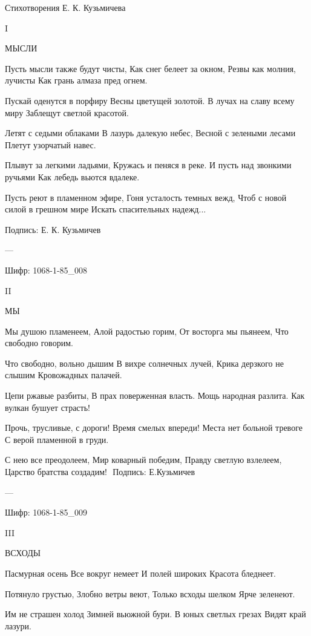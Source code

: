 Стихотворения Е. К. Кузьмичева

I

МЫСЛИ

Пусть мысли также будут чисты,
          Как снег белеет за окном, 
Резвы как молния, лучисты
          Как грань алмаза пред огнем.

Пускай оденутся в порфиру
          Весны цветущей золотой.
В лучах на славу всему миру
          Заблещут светлой красотой.

Летят с седыми облаками
          В лазурь далекую небес,
Весной с зелеными лесами
          Плетут узорчатый навес.

Плывут за легкими ладьями,
          Кружась и пеняся в реке.
И пусть над звонкими ручьями
          Как лебедь вьются вдалеке.

Пусть реют в пламенном эфире,
          Гоня усталость темных вежд,
Чтоб с новой силой в грешном мире
          Искать спасительных надежд...

Подпись: Е. К. Кузьмичев
          
---

Шифр: 1068-1-85_008

II

МЫ


Мы душою пламенеем,
Алой радостью горим,
От восторга мы пьянеем,
Что свободно говорим.

    Что свободно, вольно дышим
    В вихре солнечных лучей,
    Крика дерзкого не слышим
    Кровожадных палачей.

Цепи ржавые разбиты,
В прах поверженная власть.
Мощь народная разлита.
Как вулкан бушует страсть!

    Прочь, трусливые, с дороги!
    Время смелых впереди!
    Места нет больной тревоге
    С верой пламенной в груди.

С нею все преодолеем,
Мир коварный победим,
Правду светлую взлелеем,
Царство братства создадим!
﻿                           
Подпись: Е.Кузьмичев

---

Шифр: 1068-1-85_009

III 

ВСХОДЫ


Пасмурная осень
     Все вокруг немеет
И полей широких
     Красота бледнеет. 

Потянуло грустью,
     Злобно ветры веют,
Только всходы шелком
     Ярче зеленеют.

Им не страшен холод
     Зимней вьюжной бури.
В юных светлых грезах
     Видят край лазури.

